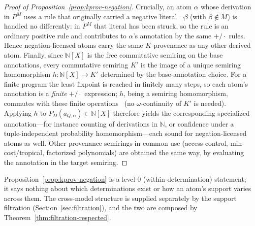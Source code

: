 \begin{proof}[Proof of Proposition~\ref{prop:kprov-negation}]
  Crucially, an atom $\alpha$ whose derivation in $P^{M}$ uses a rule that
  originally carried a negative literal $\neg\beta$ (with $\beta \notin M$) is
  handled no differently: in $P^{M}$ that literal has been struck, so the rule
  is an ordinary positive rule and contributes to $\alpha$'s annotation by the
  same $+/\cdot$ rules. Hence negation-licensed atoms carry the same
  $K$-provenance as any other derived atom. Finally, since $\mathbb{N}[X]$ is
  the free commutative semiring on the base annotations, every commutative
  semiring $K'$ is the image of a unique semiring homomorphism
  $h:\mathbb{N}[X]\to K'$ determined by the base-annotation choice. For a finite
  program the least fixpoint is reached in finitely many steps, so each atom's
  annotation is a \emph{finite} $+/\cdot$ expression; $h$, being a semiring
  homomorphism, commutes with these finite operations~\cite{green2007provenance}
  (no $\omega$-continuity of $K'$ is needed). Applying $h$ to
  $P_D(a_{Q,\alpha})\in\mathbb{N}[X]$ therefore yields the corresponding
  specialized annotation---for instance counting of derivations in $\mathbb{N}$,
  or confidence under a tuple-independent probability homomorphism---each sound
  for negation-licensed atoms as well. Other provenance semirings in common use
  (access-control, min-cost/tropical, factorized polynomials) are obtained the
  same way, by evaluating the annotation in the target semiring.
\end{proof}

\noindent
Proposition~\ref{prop:kprov-negation} is a level-$0$ (within-determination)
statement; it says nothing about which determinations exist or how an atom's
support varies across them. The cross-model structure is supplied separately by
the support filtration (Section~\ref{sec:filtration}), and the two are composed
by Theorem~\ref{thm:filtration-respected}.
